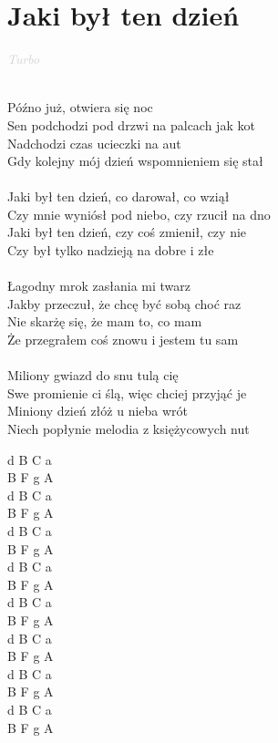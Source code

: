 \documentclass[a5paper, 10pt]{book}
\begin{document}
\section{Jaki był ten dzień}\textcolor{lightgray}{\textit{Turbo}}\\~\\
\begin{minipage}[t]{0.7\textwidth}
  Późno już, otwiera się noc\\
  Sen podchodzi pod drzwi na palcach jak kot\\
  Nadchodzi czas ucieczki na aut\\
  Gdy kolejny mój dzień wspomnieniem się stał\\
  \\
  \hspace*{5mm}Jaki był ten dzień, co darował, co wziął\\
  \hspace*{5mm}Czy mnie wyniósł pod niebo, czy rzucił na dno\\
  \hspace*{5mm}Jaki był ten dzień, czy coś zmienił, czy nie\\
  \hspace*{5mm}Czy był tylko nadzieją na dobre i złe\\
  \\
  Łagodny mrok zasłania mi twarz\\
  Jakby przeczuł, że chcę być sobą choć raz\\
  Nie skarżę się, że mam to, co mam\\
  Że przegrałem coś znowu i jestem tu sam\\
  \\
  Miliony gwiazd do snu tulą cię\\
  Swe promienie ci ślą, więc chciej przyjąć je\\
  Miniony dzień złóż u nieba wrót\\
  Niech popłynie melodia z księżycowych nut\\

\end{minipage}
\begin{minipage}[t]{0.3\textwidth}
  d B C a\\
  B F g A\\
  d B C a\\
  B F g A\\

  d B C a\\
  B F g A\\
  d B C a\\
  B F g A\\

  d B C a\\
  B F g A\\
  d B C a\\
  B F g A\\

  d B C a\\
  B F g A\\
  d B C a\\
  B F g A\\
\end{minipage}
\end{document}

